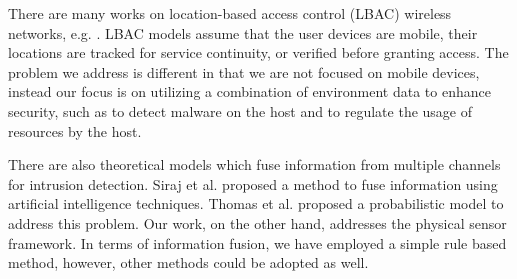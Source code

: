 There are many works on location-based access control (LBAC) 
wireless networks, e.g. \cite{ardagna06}. 
LBAC models assume that the user devices are mobile,
their locations are tracked for service continuity, or verified
before granting access.  The problem we address is different in that
we are not focused on mobile devices, instead our focus is on
utilizing a combination of environment data to enhance security,
such as to detect malware on the host and to regulate the usage of
resources by the host.

There are also theoretical models which fuse information from multiple channels
for intrusion detection.
Siraj et al. proposed a method \cite{siraj04} to fuse information
using artificial intelligence techniques.
Thomas et al. proposed a probabilistic model \cite{thomas09} to address
this problem.
Our work, on the other hand, addresses the physical sensor framework.
In terms of information fusion, we have employed
a simple rule based method, however, other methods could be adopted as well.
